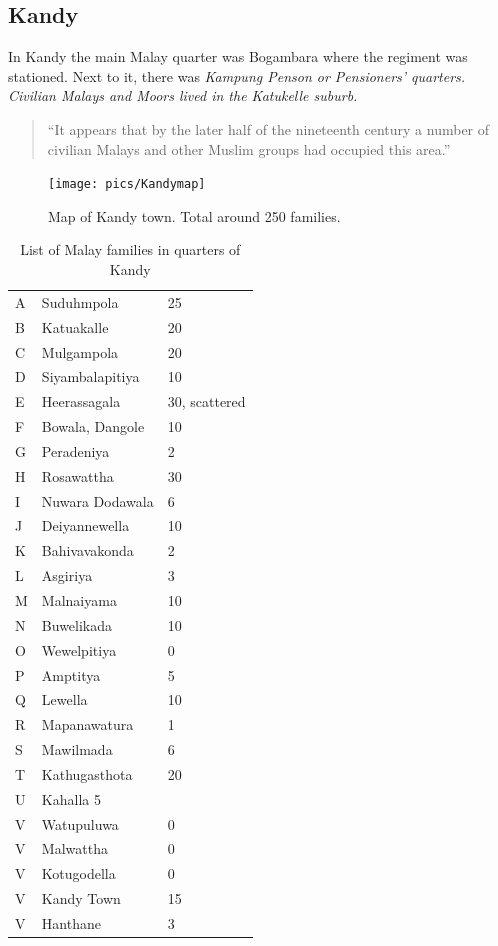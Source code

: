 \subsection{Kandy}\label{sec:slmbg:Kandy}

In Kandy the main Malay quarter was Bogambara where the regiment was stationed. Next to it, there was \em Kampung Penson \em or Pensioners' quarters. \kuckn Civilian Malays and Moors lived in the Katukelle suburb.

\begin{quote}
    ``It appears that by the later half of the nineteenth century a number of civilian Malays and other Muslim groups had occupied this area.''\citep[113]{Hussainmiya1990}
\end{quote}

\begin{figure}
	\centering
		\texttt{[image: pics/Kandymap]}
	\caption[Map of Kandy town]{Map of Kandy town. Total around 250 families.}
	\label{fig:Kandymap}
\end{figure}

\begin{table}
	\centering
		\begin{tabular}{lll}
		A & Suduhmpola	& 25	\\
		B &	Katuakalle 	& 20	\\
		C &	Mulgampola  &	20\\
		D &	Siyambalapitiya & 10	\\
		E & Heerassagala 	&	 30, scattered\\
		F &	Bowala, Dangole& 10	\\
		G &	Peradeniya &	2\\
		H &	Rosawattha& 30	\\
		I &	Nuwara Dodawala& 6	\\
		J &	Deiyannewella&	10\\
		K &	Bahivavakonda &	2\\
		L &	Asgiriya &	3\\
		M &	Malnaiyama&	10\\
		N &	Buwelikada & 10	\\
		O &	Wewelpitiya & 0	\\
		P &	Amptitya &	5\\
		Q &	Lewella & 10	\\
		R &	Mapanawatura &	1\\
		S &	Mawilmada & 6	\\
		T	&	Kathugasthota & 20 \\
		U & Kahalla 5 &	\\
		V &	Watupuluwa &	0\\
		V &	Malwattha &	0\\
		V &	Kotugodella &	0\\
		V &	Kandy Town &	15\\
		V &	Hanthane &	3\\
		\end{tabular}
	\caption{List of Malay families in quarters of Kandy}
	\label{tab:ListOfMalayFamiliesInQuartersOfKandy}
\end{table}


